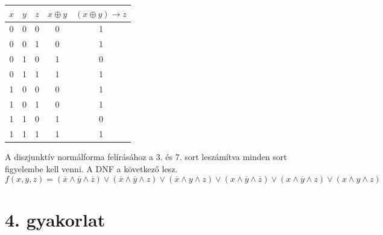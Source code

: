 \documentclass[a4paper]{article}
\newenvironment{solution}
{\color{RoyalBlue}}{\bigskip}
\begin{document}
\begin{enumerate}
\begin{solution}
\begin{center}
\begin{tabular}{|ccc|c|c|}
$x$ & $y$ & $z$ & $x \oplus y $ & $(x \oplus y) \rightarrow z$ \\
\hline
0 & 0 & 0 & 0 & 1 \\
0 & 0 & 1 & 0 & 1 \\
0 & 1 & 0 & 1 & 0 \\
0 & 1 & 1 & 1 & 1 \\
1 & 0 & 0 & 0 & 1 \\
1 & 0 & 1 & 0 & 1 \\
1 & 1 & 0 & 1 & 0 \\
1 & 1 & 1 & 1 & 1 \\
\hline
\end{tabular}
\end{center}
A diszjunktív normálforma felírásához a 3. és 7. sort leszámítva minden sort figyelembe kell venni. A DNF a következő lesz.
$$
f(x, y, z) =
(\overline{x} \wedge \overline{y} \wedge \overline{z}) \vee
(\overline{x} \wedge \overline{y} \wedge z) \vee
(\overline{x} \wedge y \wedge z) \vee
(x \wedge \overline{y} \wedge \overline{z}) \vee
(x \wedge \overline{y} \wedge z) \vee
(x \wedge y \wedge z)
$$
\end{solution}

\end{enumerate}

\section*{4. gyakorlat}
\end{document}
